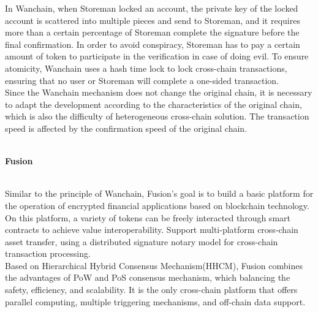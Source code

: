 \noindent In Wanchain, when Storeman locked an account, the private key of the locked account is scattered into multiple pieces and send to Storeman, and it requires more than a certain percentage of Storeman complete the signature before the final confirmation. In order to avoid conspiracy, Storeman has to pay a certain amount of token to participate in the verification in case of doing evil. To ensure atomicity, Wanchain uses a hash time lock to lock cross-chain transactions, ensuring that no user or Storeman will complete a one-sided transaction.\\

\noindent Since the Wanchain mechanism does not change the original chain, it is necessary to adapt the development according to the characteristics of the original chain, which is also the difficulty of heterogeneous cross-chain solution. The transaction speed is affected by the confirmation speed of the original chain.\\\\
\begin{large}
\textbf{Fusion}
\end{large}\cite{fusion}\\


\noindent Similar to the principle of Wanchain, Fusion's goal is to build a basic platform for the operation of encrypted financial applications based on blockchain technology. On this platform, a variety of tokens can be freely interacted through smart contracts to achieve value interoperability. Support multi-platform cross-chain asset transfer, using a distributed signature notary model for cross-chain transaction processing.\\

\noindent Based on Hierarchical Hybrid Consensus Mechanism(HHCM), Fusion combines the advantages of PoW and PoS consensus mechanism, which balancing the safety, efficiency, and scalability. It is the only cross-chain platform that offers parallel computing, multiple triggering mechanisms, and off-chain data support.\\

